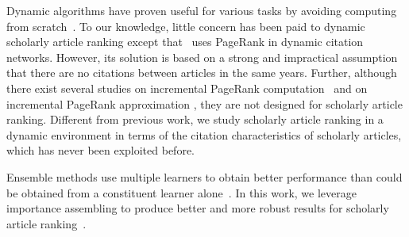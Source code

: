 Dynamic algorithms have proven useful for various tasks by avoiding computing from scratch~\cite{RamalingamR93}.
To our knowledge, little concern has been paid to dynamic scholarly article ranking except that~\cite{GhoshKHLL11} uses PageRank in dynamic citation networks. However, its solution is based on a strong and impractical assumption that there are no citations between articles in the same years.
Further, although there exist several studies on incremental PageRank computation~\cite{DesikanPSK05,AbiteboulPC03,WuR09} and on incremental PageRank approximation \cite{BahmaniCG10,BahmaniKMU12}, they are not designed for scholarly article ranking.
%
Different from previous work, we study scholarly article ranking in a dynamic environment in terms of
the citation characteristics of scholarly articles, which has never been exploited before.


Ensemble methods use multiple learners to obtain better performance than could be obtained from a constituent learner alone~\cite{zhihua-book}.
In this work, we leverage  importance assembling  to produce better and more robust results for scholarly article ranking~\cite{zhihua-book,wsdmcup,DuanAMHH16}.
